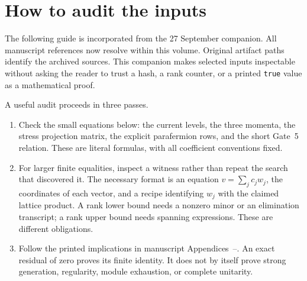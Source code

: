 \section{How to audit the inputs}
The following guide is incorporated from the 27 September companion. All manuscript references now resolve within this volume. Original artifact paths identify the archived sources. This companion makes selected inputs inspectable without
asking the reader to trust a hash, a rank counter, or a printed
\texttt{true} value as a mathematical proof.

A useful audit proceeds in three passes.
\begin{enumerate}
\item Check the small equations below: the current levels, the three
momenta, the stress projection matrix, the explicit parafermion rows,
and the short Gate~5 relation. These are literal formulas, with all
coefficient conventions fixed.
\item For larger finite equalities, inspect a witness rather than repeat
the search that discovered it. The necessary format is an equation
$v=\sum_j c_jw_j$, the coordinates of each vector, and a recipe identifying
$w_j$ with the claimed lattice product. A rank lower bound needs a
nonzero minor or an elimination transcript; a rank upper bound needs
spanning expressions. These are different obligations.
\item Follow the printed implications in manuscript
Appendices~--.
An exact residual of zero proves its finite identity. It does not by
itself prove strong generation, regularity, module exhaustion, or
complete unitarity.
\end{enumerate}

